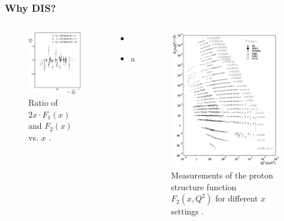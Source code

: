 \documentclass[12pt]{beamer}
\begin{document}

\begin{frame}
\frametitle{Why DIS?}
\begin{columns}[c] %
			\vspace*{-30pt}
	\begin{figure}[t]
	\centering
	\includegraphics[width=5cm]{../images/Thesis/f1_f2_spin.pdf} 
	\caption*{Ratio of $2x\cdot F_1(x)$ and $F_2(x)$ vs. $x$ \cite{PnN,IntroHEP}.}
	\label{fig:spin1/2}
\end{figure} 
			\vspace*{-10pt}
\begin{block}{}
	\begin{itemize}
		\item 

		\item a
	\end{itemize}
	
\end{block}
\begin{figure}[t]
	\vspace*{-30pt}
	\centering
	\includegraphics[width=5cm]{../images/Thesis/SLAC_F2.png} 
	\caption*{ Measurements of the proton structure function $F_2(x, Q^2)$ for different $x$ settings\cite{ref:rev_pp} .}
	\label{F2_fig}
\end{figure} 
\end{columns}
\end{frame}
\end{document}
